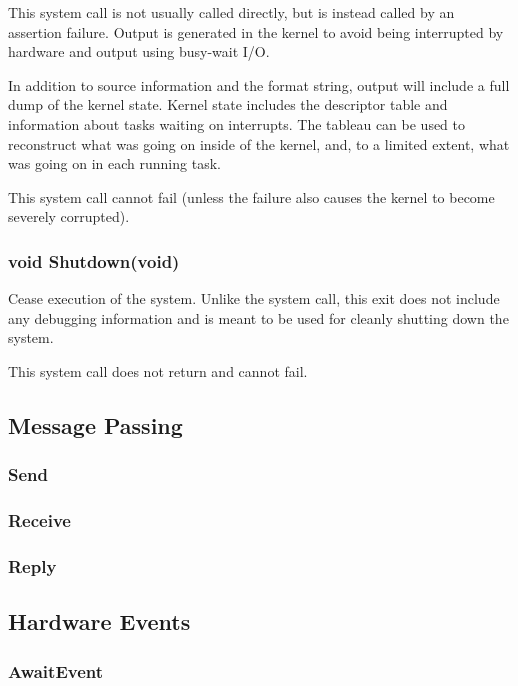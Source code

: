 \documentclass[pdftex,10pt,a4paper]{article}
\begin{document}
This system call is not usually called directly, but is instead called
by an assertion failure. Output is generated in the kernel to avoid
being interrupted by hardware and output using busy-wait I/O.

In addition to source information and the format string, output will
include a full dump of the kernel state. Kernel state includes the
descriptor table and information about tasks waiting on
interrupts. The tableau can be used to reconstruct what was going on
inside of the kernel, and, to a limited extent, what was going on in
each running task.

This system call cannot fail (unless the failure also causes the
kernel to become severely corrupted).


\subsubsection*{void Shutdown(void)}

Cease execution of the system. Unlike the  system call,
this exit does not include any debugging information and is meant to
be used for cleanly shutting down the system.

This system call does not return and cannot fail.


\subsection*{Message Passing}

\subsubsection*{Send}
\subsubsection*{Receive}
\subsubsection*{Reply}

\subsection*{Hardware Events}

\subsubsection*{AwaitEvent}
\end{document}
